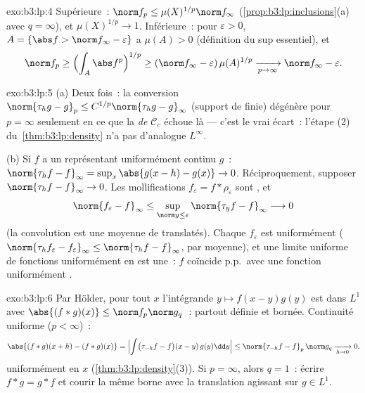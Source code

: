 \begin{solution}{exo:b3:lp:4}
Supérieure~: $\norm f_p \leq \mu(X)^{1/p}\norm f_\infty$
(\cref{prop:b3:lp:inclusions}(a) avec $q = \infty$), et
$\mu(X)^{1/p} \to 1$. Inférieure~: pour $\varepsilon > 0$,
$A = \{\abs f > \norm f_\infty - \varepsilon\}$ a $\mu(A) >
0$ (définition du sup essentiel), et
\[
\norm f_p \geq \Bigl(\int_A \abs f^p\Bigr)^{1/p}
\geq (\norm f_\infty - \varepsilon)\,\mu(A)^{1/p}
\xrightarrow[p\to\infty]{} \norm f_\infty - \varepsilon .
\]
\end{solution}

\begin{solution}{exo:b3:lp:5}
(a) Deux fois~: la conversion $\norm{\tau_hg - g}_p \leq
C^{1/p}\norm{\tau_hg - g}_\infty$ (support de  finie)
dégénère pour $p = \infty$ seulement en ce que la
\emph{ de $\mathcal C_c$} échoue là --- c'est le vrai
écart~: l'étape (2) du~\cref{thm:b3:lp:density} n'a pas
d'analogue $L^\infty$.

(b) Si $f$ a un représentant uniformément continu $g$~:
$\norm{\tau_hf - f}_\infty = \sup_x\abs{g(x - h) - g(x)} \to
0$. Réciproquement, supposer $\norm{\tau_hf - f}_\infty \to
0$. Les mollifications $f_\varepsilon = f *
\rho_\varepsilon$ sont , et
\[
\norm{f_\varepsilon - f}_\infty
\leq \sup_{\norm y \leq \varepsilon}\norm{\tau_yf -
f}_\infty \longrightarrow 0
\]
(la convolution est une moyenne de translatés). Chaque
$f_\varepsilon$ est uniformément 
($\norm{\tau_hf_\varepsilon - f_\varepsilon}_\infty \leq
\norm{\tau_hf - f}_\infty$, par moyenne), et une limite
uniforme de fonctions uniformément  en est une~: $f$
coïncide p.p.\ avec une fonction uniformément .
\end{solution}

\begin{solution}{exo:b3:lp:6}
Par Hölder, pour tout $x$ l'intégrande $y \mapsto f(x -
y)g(y)$ est dans $L^1$ avec $\abs{(f*g)(x)} \leq \norm
f_p\norm g_q$~: partout définie et bornée. Continuité
uniforme ($p < \infty$)~:
\[
\abs{(f*g)(x + h) - (f*g)(x)}
= \Bigl|\int\bigl(\tau_{-h}f - f\bigr)(x - y)\,g(y)\dd y\Bigr|
\leq \norm{\tau_{-h}f - f}_p\,\norm g_q
\xrightarrow[h\to0]{} 0,
\]
uniformément en $x$ (\cref{thm:b3:lp:density}(3)). Si $p =
\infty$, alors $q = 1$~: écrire $f * g = g * f$ et courir la
même borne avec la translation agissant sur $g \in L^1$.
\end{solution}

